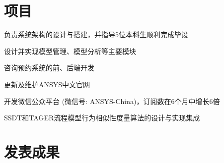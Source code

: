 \documentclass[a4paper]{resume-zh}
\begin{document}
\begin{minipage}[t]{0.72\textwidth}

\section{项目}

\begin{tightitemize}
\item 负责系统架构的设计与搭建，并指导5位本科生顺利完成毕设
\item 设计并实现模型管理、模型分析等主要模块
\end{tightitemize}

\sectionspace


\begin{tightitemize}
\item 咨询预约系统的前、后端开发
\end{tightitemize}

\sectionspace


\begin{tightitemize}
\item 更新及维护ANSYS中文官网
\item 开发微信公众平台 (微信号: ANSYS-China)，订阅数在6个月中增长6倍
\end{tightitemize}

\sectionspace


\begin{tightitemize}
\item SSDT和TAGER流程模型行为相似性度量算法的设计与实现集成
\end{tightitemize}





\section{发表成果} 
\renewcommand\refname{\vskip -2cm} %


\nocite{*}

\end{minipage}
\end{document}
